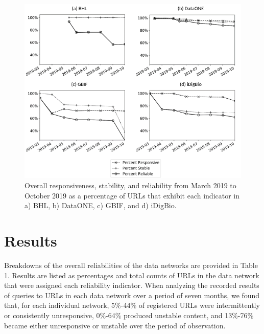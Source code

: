 \documentclass[10pt,letterpaper]{article}
\begin{document}
\begin{figure}[ht] %


\includegraphics[width=\textwidth]{fig2.png}

\caption{Overall responsiveness, stability, and reliability from March 2019 to October 2019 as a percentage of URLs that exhibit each indicator in a) BHL, b) DataONE, c) GBIF, and d) iDigBio.
}

\label{fig2} %

\end{figure}


\section*{Results}

Breakdowns of the overall reliabilities of the data networks are provided in Table 1. Results are listed as percentages and total counts of URLs in the data network that were assigned each reliability indicator. When analyzing the recorded results of queries to URLs in each data network over a period of seven months, we found that, for each individual network, 5\%-44\% of registered URLs were intermittently or consistently unresponsive, 0\%-64\% produced unstable content, and 13\%-76\% became either unresponsive or unstable over the period of observation.
\end{document}
